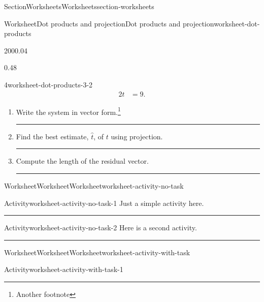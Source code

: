 \documentclass[oneside,10pt,]{article}
\newlength{\ptxworkspacestrutwidth}
\numberwithin{equation}{section}
\newcommand{\amp}{&}
\begin{document}
\begin{sectionptx}{Section}{Worksheets}{}{Worksheets}{}{}{section-worksheets}
\begin{worksheet-subsection}{Worksheet}{Dot products and projection}{}{Dot products and projection}{}{}{worksheet-dot-products}
\begin{savenotes}
\begin{sidebyside}{2}{0}{0}{0.04}
\begin{sbspanel}{0.48}
\begin{savenotes}
\begin{divisionexercise}{4}{}{}{worksheet-dot-products-3-2}
\begin{align*}
2t \amp = 9 \text{.}
\end{align*}
%
\begin{enumerate}[font=\bfseries,label=(\alph*),ref=\alph*]%
\item{}Write the system in vector form.\footnote{Another footnote\label{worksheet-dot-products-3-2-2-1-1}}%
\par\rule{\ptxworkspacestrutwidth}{2in}%
\item{}Find the best estimate, \(\hat t\), of \(t\) using projection.%
\par\rule{\ptxworkspacestrutwidth}{3.9in}%
\item{}Compute the length of the residual vector.%
\par\rule{\ptxworkspacestrutwidth}{2in}%
\end{enumerate}%
\end{divisionexercise}%
\end{savenotes}%
\end{sbspanel}%
\end{sidebyside}%
\end{savenotes}%
\end{worksheet-subsection}
\restoregeometry
%
%
\typeout{************************************************}
\typeout{************************************************}
%
\begin{worksheet-subsection}{Worksheet}{Worksheet}{}{Worksheet}{}{}{worksheet-activity-no-task}
\begin{activity}{Activity}{}{worksheet-activity-no-task-1}%
Just a simple activity here.%
\par\rule{\ptxworkspacestrutwidth}{1in}%
\end{activity}%
\begin{activity}{Activity}{}{worksheet-activity-no-task-2}%
Here is a second activity.%
\par\rule{\ptxworkspacestrutwidth}{1in}%
\end{activity}%
\end{worksheet-subsection}
\restoregeometry
%
%
\typeout{************************************************}
\typeout{************************************************}
%
\begin{worksheet-subsection}{Worksheet}{Worksheet}{}{Worksheet}{}{}{worksheet-activity-with-task}
\begin{activity}{Activity}{}{worksheet-activity-with-task-1}%

\end{activity}
\end{worksheet-subsection}
\end{sectionptx}
\end{document}
